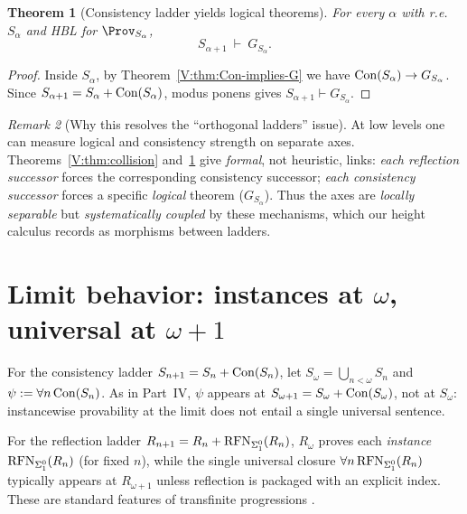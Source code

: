 \documentclass[11pt]{article}
\newtheorem{theorem}{Theorem}[section]
\theoremstyle{definition}
\theoremstyle{remark}
\newtheorem{remark}[theorem]{Remark}
\begin{document}
\begin{theorem}[Consistency ladder yields logical theorems]\label{V:thm:cons-yields-G}
For every \(\alpha\) with r.e.\ \(S_\alpha\) and HBL for \(\Prov_{S_\alpha}\),
\[
S_{\alpha+1}\ \vdash\ G_{S_\alpha}.
\]
\end{theorem}

\begin{proof}
Inside \(S_\alpha\), by Theorem~\ref{V:thm:Con-implies-G} we have \(\mathrm{Con}(S_\alpha)\to G_{S_\alpha}\).
Since \(S_{\alpha+1}=S_\alpha+\mathrm{Con}(S_\alpha)\), modus ponens gives \(S_{\alpha+1}\vdash G_{S_\alpha}\).
\end{proof}

\begin{remark}[Why this resolves the “orthogonal ladders” issue]
At low levels one can measure logical and consistency strength on separate axes.
Theorems~\ref{V:thm:collision} and~\ref{V:thm:cons-yields-G} give \emph{formal}, not heuristic, links:
\emph{each reflection successor} forces the corresponding consistency successor; \emph{each consistency successor}
forces a specific \emph{logical} theorem ($G_{S_\alpha}$). Thus the axes are \emph{locally separable}
but \emph{systematically coupled} by these mechanisms, which our height calculus records as
morphisms between ladders.
\end{remark}

\section{Limit behavior: instances at \texorpdfstring{$\omega$}{ω}, universal at \texorpdfstring{$\omega{+}1$}{ω+1}}

For the consistency ladder \(S_{n+1}=S_n+\mathrm{Con}(S_n)\), let \(S_\omega=\bigcup_{n<\omega}S_n\) and
\(\psi:=\forall n\,\mathrm{Con}(S_n)\). As in Part~IV, \(\psi\) appears at \(S_{\omega+1}=S_\omega+\mathrm{Con}(S_\omega)\),
not at \(S_\omega\): instancewise provability at the limit does not entail a single universal sentence.

For the reflection ladder \(R_{n+1}=R_n+\mathrm{RFN}_{\Sigma^0_1}(R_n)\), \(R_\omega\) proves each \emph{instance}
\(\mathrm{RFN}_{\Sigma^0_1}(R_n)\) (for fixed \(n\)), while the single universal closure
\(\forall n\,\mathrm{RFN}_{\Sigma^0_1}(R_n)\) typically appears at \(R_{\omega+1}\) unless reflection is packaged with an explicit index.
These are standard features of transfinite progressions \cite{Feferman1962,HajekPudlak}.
\end{document}
